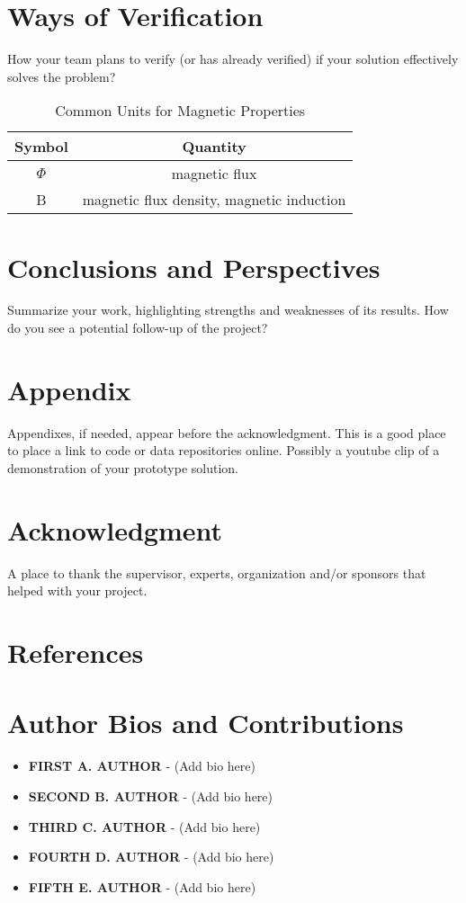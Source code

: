 \documentclass{article}
\begin{document}
\section{Ways of Verification}
How your team plans to verify (or has already verified) if your solution effectively solves the problem?

\begin{table}[h!]
    \centering
    \begin{tabular}{c c}
         Symbol & Quantity \\
         \hline
         $\Phi$ & magnetic flux \\
         B & magnetic flux density, magnetic induction
    \end{tabular}
    \caption{Common Units for Magnetic Properties}
    \label{tab:example}
\end{table}

\section{Conclusions and Perspectives}
Summarize your work, highlighting strengths and weaknesses of its results. How do you see a potential follow-up of the project?

\section*{Appendix}
Appendixes, if needed, appear before the acknowledgment. This is a good place to place a link to code or data repositories online. Possibly a youtube clip of a demonstration of your prototype solution.

\section*{Acknowledgment}
A place to thank the supervisor, experts, organization and/or sponsors that helped with your project.

\section*{References}
\printbibliography

\section*{Author Bios and Contributions}


\begin{itemize}[label={}, leftmargin=0pt, itemsep=0pt, parsep=0pt]
    \item \textbf{FIRST A. AUTHOR} - (Add bio here)
    \item \textbf{SECOND B. AUTHOR} - (Add bio here)
    \item \textbf{THIRD C. AUTHOR} - (Add bio here)
    \item \textbf{FOURTH D. AUTHOR} - (Add bio here)
    \item \textbf{FIFTH E. AUTHOR} - (Add bio here)
\end{itemize}
\end{document}
